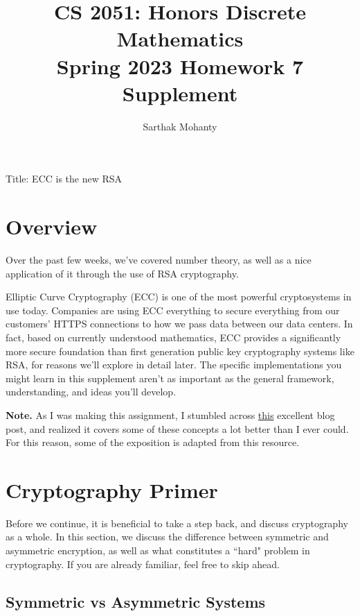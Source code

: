 \documentclass{article}
\title{\vspace{-1cm}CS 2051: Honors Discrete Mathematics \\Spring 2023 Homework 7 Supplement}
\author{Sarthak Mohanty}
\date{}
\begin{document}
\maketitle

Title: ECC is the new RSA




\section*{Overview}

Over the past few weeks, we've covered number theory, as well as a nice application of it through the use of RSA cryptography.

\vspace{2mm}
Elliptic Curve Cryptography (ECC) is one of the most powerful cryptosystems in use today. Companies are using ECC everything to secure everything from our customers' HTTPS connections to how we pass data between our data centers. In fact, based on currently understood mathematics, ECC provides a significantly more secure foundation than first generation public key cryptography systems like RSA, for reasons we'll explore in detail later. The specific implementations you might learn in this supplement aren't as important as the general framework, understanding, and ideas you'll develop.

\vspace{2mm}
\textbf{Note.} As I was making this assignment, I stumbled across \href{https://andrea.corbellini.name/2015/05/17/elliptic-curve-cryptography-a-gentle-introduction/}{this} excellent blog post, and realized it covers some of these concepts a lot better than I ever could. For this reason, some of the exposition is adapted from this resource.


\section*{Cryptography Primer}
    Before we continue, it is beneficial to take a step back, and discuss cryptography as a whole. In this section, we discuss the difference between symmetric and asymmetric encryption, as well as what constitutes a ``hard" problem in cryptography. If you are already familiar, feel free to skip ahead.

\subsection*{Symmetric vs Asymmetric Systems}
\end{document}
